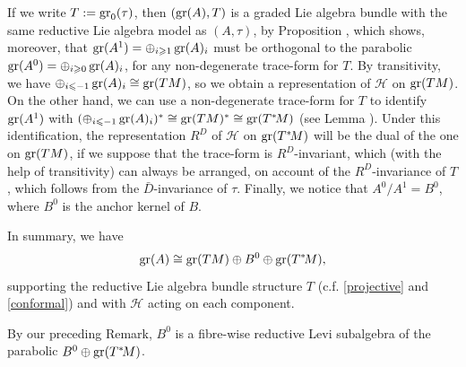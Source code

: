 \documentclass[leqno,12pt]{amsart} %
\begin{document}
If we write $T := \operatorname{\operatorname{gr}}_0(\tau)$, then $(\operatorname{\operatorname{gr}}(A), T)$ is a graded Lie algebra bundle
with the same reductive Lie algebra model as $(A, \tau )$, by Proposition
, which shows, moreover, that
$\operatorname{\operatorname{gr}}(A^1)=\oplus_{i\geqslant 1}\operatorname{\operatorname{gr}}(A)_i$ must be orthogonal to the parabolic
$\operatorname{\operatorname{gr}}(A^0)=\oplus_{i\geqslant 0}\operatorname{\operatorname{gr}}(A)_i$, for any non-degenerate trace-form for $T$. By
transitivity, we have $\oplus_{i\leqslant -1}\operatorname{\operatorname{gr}}(A)_i \cong \operatorname{\operatorname{gr}}(TM)$, so we obtain a
representation of ${\mathcal H} $ on $\operatorname{\operatorname{gr}}(TM)$. On the other hand, we can use a
non-degenerate trace-form for $T$ to identify $\operatorname{\operatorname{gr}}(A^1)$ with
$(\oplus_{i\leqslant -1}\operatorname{\operatorname{gr}}(A)_i)^*\cong \operatorname{\operatorname{gr}}(TM)^*\cong\operatorname{\operatorname{gr}}(T^*\!M)$ (see Lemma
). Under this identification, the representation $R^D$ of
${\mathcal H} $ on $\operatorname{\operatorname{gr}}(T^*\!M)$ will be the dual of the one on $\operatorname{\operatorname{gr}}(TM)$, if we
suppose that the trace-form is $R^D$-invariant, which (with the help of transitivity) can
always be arranged, on account of the $R^D$-invariance of $T$, which follows from the
$\bar D$-invariance of $\tau$. Finally, we notice that $A^0/A^1 = B^0$, where $B^0$ is the
anchor kernel of $B$.

In summary, we have
\begin{equation}
  \operatorname{\operatorname{gr}}(A) \cong \operatorname{\operatorname{gr}}(TM) \oplus B^0 \oplus \operatorname{\operatorname{gr}}(T^*\!M),\label{soldering}
\end{equation}
supporting the reductive Lie algebra bundle structure $T$ (c.f. \ref{projective}
and \ref{conformal}) and with ${\mathcal H}$ acting on each component.

\begin{remark}
  By our preceding Remark, $B^0$ is a fibre-wise reductive Levi subalgebra of the
  parabolic $B^0 \oplus \operatorname{\operatorname{gr}}(T^*\!M)$.
\end{remark}
\end{document}
